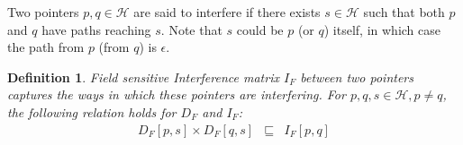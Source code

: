\documentclass{sig-alternate}
\newtheorem{definition}{Definition}
\newcommand{\p}{\ensuremath{p}}
\newcommand{\q}{\ensuremath{q}}
\newcommand{\s}{\ensuremath{s}}
\newcommand{\heap}{\ensuremath{\mathcal{H}}}
\newcommand{\DFM}[2]{\ensuremath{D_F[#1,#2]}}
\newcommand{\IFM}[2]{\ensuremath{I_F[#1,#2]}}
\newcommand{\sub}[2]{\ensuremath{{#1}_{#2}}}
\begin{document}
Two pointers $\p,\q \in \heap$ are said to
interfere if there exists $\s \in \heap$ such that both
$\p$ and $\q$ have paths reaching $\s$. Note that $\s$ could
be $\p$ (or $\q$) itself, in which case the path from $\p$
(from $\q$) is $\epsilon$.

\begin{definition}\label{IFM_matrix}
Field sensitive Interference matrix $\sub{I}{F}$ between
two pointers captures the ways in which these pointers are
interfering.  For $\p, \q, \s \in \heap, \p \not= \q$,
the following relation holds for $D_F$ and $I_F$: 
\begin{eqnarray*}
  \DFM{p}{s} \times \DFM{q}{s} &\sqsubseteq& \IFM{p}{q} \label {eq:rel-df-if}
\end{eqnarray*}
\end{definition}
\end{document}
